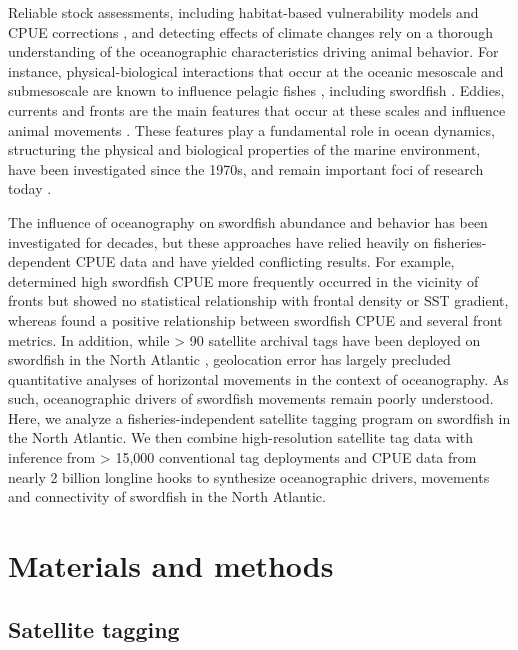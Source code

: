 Reliable stock assessments, including habitat-based vulnerability models and CPUE corrections \citep{Hinton1996, Bigelow2007}, and detecting effects of climate changes \citep{Schirripa2016} rely on a thorough understanding of the oceanographic characteristics driving animal behavior. For instance, physical-biological interactions that occur at the oceanic mesoscale \citep[$\mathcal{O}$(10-100 km);][]{McGillicuddy2016} and submesoscale \citep[$\mathcal{O}$(1 km); ][]{flierl2002mesoscale, levy2012bringing} are known to influence pelagic fishes \citep{teo2010comparative, Seki2002, godo2012mesoscale}, including swordfish \citep{Podesta1993, Scales2017}. Eddies, currents and fronts are the main features that occur at these scales and influence animal movements \citep{Hobday2014}. These features play a fundamental role in ocean dynamics, structuring the physical and biological properties of the marine environment, have been investigated since the 1970s, and remain important foci of research today \citep{McGillicuddy2016}.

The influence of oceanography on swordfish abundance and behavior has been investigated for decades, but these approaches have relied heavily on fisheries-dependent CPUE data and have yielded conflicting results. For example, \citet{Podesta1993} determined high swordfish CPUE more frequently occurred in the vicinity of fronts but showed no statistical relationship with frontal density or SST gradient, whereas \citet{Bigelow1999} found a positive relationship between swordfish CPUE and several front metrics. In addition, while > 90 satellite archival tags have been deployed on swordfish in the North Atlantic \citep{Braun2015}, geolocation error has largely precluded quantitative analyses of horizontal movements in the context of oceanography. As such, oceanographic drivers of swordfish movements remain poorly understood. Here, we analyze a fisheries-independent satellite tagging program on swordfish in the North Atlantic. We then combine high-resolution satellite tag data with inference from > 15,000 conventional tag deployments and CPUE data from nearly 2 billion longline hooks to synthesize oceanographic drivers, movements and connectivity of swordfish in the North Atlantic.

\section{Materials and methods}

\subsection{Satellite tagging}\label{sat-tag-methods}

